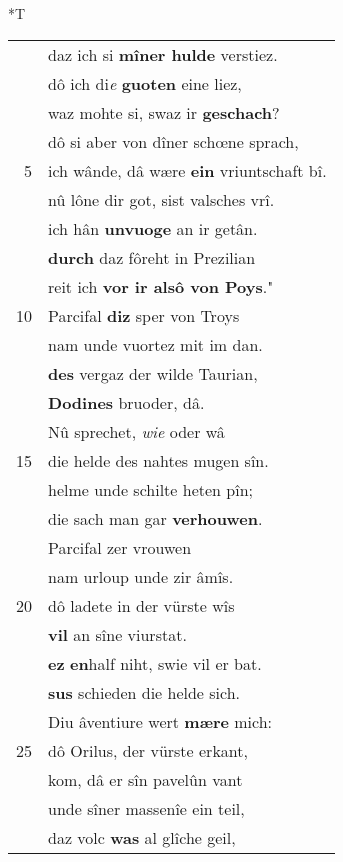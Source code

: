 \documentclass[8pt,a4paper,notitlepage]{article}
\begin{document}
\begin{table}[ht]
\begin{minipage}[t]{0.5\linewidth}
\end{minipage}
\hspace{0.5cm}
\begin{minipage}[t]{0.5\linewidth}
\small
\begin{center}*T
\end{center}
\begin{tabular}{rl}
 & daz ich si \textbf{mîner hulde} verstiez.\\ 
 & dô ich di\textit{e} \textbf{guoten} eine liez,\\ 
 & waz mohte si, swaz ir \textbf{geschach}?\\ 
 & dô si aber von dîner schœne sprach,\\ 
5 & ich wânde, dâ wære \textbf{ein} vriuntschaft bî.\\ 
 & nû lône dir got, sist valsches vrî.\\ 
 & ich hân \textbf{unvuoge} an ir getân.\\ 
 & \textbf{durch} daz fôreht in Prezilian\\ 
 & reit ich \textbf{vor ir alsô von Poys}."\\ 
10 & Parcifal \textbf{diz} sper von Troys\\ 
 & nam unde vuortez mit im dan.\\ 
 & \textbf{des} vergaz der wilde Taurian,\\ 
 & \textbf{Dodines} bruoder, dâ.\\ 
 & Nû sprechet, \textit{wie} oder wâ\\ 
15 & die helde des nahtes mugen sîn.\\ 
 & helme unde schilte heten pîn;\\ 
 & die sach man gar \textbf{verhouwen}.\\ 
 & Parcifal zer vrouwen\\ 
 & nam urloup unde zir âmîs.\\ 
20 & dô ladete in der vürste wîs\\ 
 & \textbf{vil} an sîne viurstat.\\ 
 & \textbf{ez} \textbf{en}half niht, swie vil er bat.\\ 
 & \textbf{sus} schieden die helde sich.\\ 
 & Diu âventiure wert \textbf{mære} mich:\\ 
25 & dô Orilus, der vürste erkant,\\ 
 & kom, dâ er sîn pavelûn vant\\ 
 & unde sîner massenîe ein teil,\\ 
 & daz volc \textbf{was} al glîche geil,\\ 

\end{tabular}
\end{minipage}
\end{table}
\end{document}
